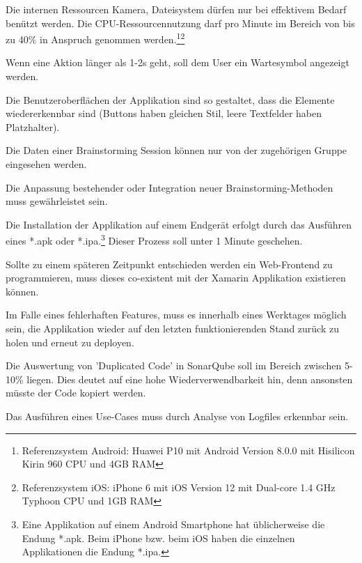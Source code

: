 \begin{description}[leftmargin=!,labelwidth=\widthof{\bfseries Wiederverwendbarkeit}]
	\item[Ressourcennutzung] Die internen Ressourcen Kamera, Dateisystem dürfen nur bei effektivem Bedarf benützt werden. Die CPU-Ressourcen\-nutzung darf pro Minute im Bereich von bis zu 40\% in Anspruch genommen werden.\footnote{Referenzsystem Android: Huawei P10 mit Android Version 8.0.0 mit Hisilicon Kirin 960 CPU und 4GB RAM}\footnote{Referenzsystem iOS: iPhone 6 mit iOS Version 12 mit Dual-core 1.4 GHz Typhoon CPU und 1GB RAM}
	
	\item[Bedienbarkeit] Wenn eine Aktion länger als 1-2s geht, soll dem User ein Wartesymbol angezeigt werden. 
	
	\item[Ästhetik] Die Benutzeroberflächen der Applikation sind so gestaltet, dass die Elemente wiedererkennbar sind (Buttons haben gleichen Stil, leere Textfelder haben Platzhalter). 
	
	\item[Vertraulichkeit] Die Daten einer Brainstorming Session können nur von der zugehörigen Gruppe eingesehen werden. 
	
	\item[Anpassbarkeit] Die Anpassung bestehender oder Integration neuer Brain\-storming-Methoden muss gewährleistet sein.
	
	\item[Installierbarkeit] Die Installation der Applikation auf einem Endgerät erfolgt durch das Ausführen eines *.apk oder *.ipa.\footnote{Eine Applikation auf einem Android Smartphone hat üblicherweise die Endung *.apk. Beim iPhone bzw. beim iOS haben die einzelnen Applikationen die Endung *.ipa.} Dieser Prozess soll unter 1 Minute geschehen.
	
	\item[Co-Existenz] Sollte zu einem späteren Zeitpunkt entschieden werden ein Web-Frontend zu programmieren, muss dieses co-existent mit der Xamarin Applikation existieren können.
	
	\item[Wiederherstellbarkeit] Im Falle eines fehlerhaften Features, muss es innerhalb eines Werktages möglich sein, die Applikation wieder auf den letzten funktionierenden Stand zurück zu holen und erneut zu deployen.	
	
	\item[Wiederverwendbarkeit] Die Auswertung von 'Duplicated Code' in SonarQube soll im Bereich zwischen 5-10\% \cite{Duplicated_Code} liegen. Dies deutet auf eine hohe Wiederverwendbarkeit hin, denn ansonsten müsste der Code kopiert werden. 
	
	\item[Analysierbarkeit] Das Ausführen eines Use-Cases muss durch Analyse von Logfiles erkennbar sein.
\end{description}
